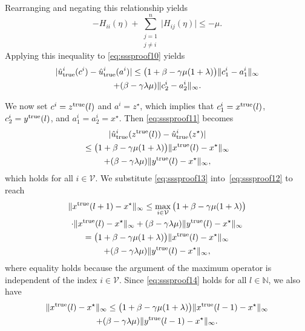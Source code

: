 \documentclass[9pt,shortpaper,twoside,web]{ieeecolor}
\newcommand{\V}{\ensuremath{\mathcal{V}}\xspace}
\newcommand{\tr}{\textnormal{true}}
\begin{document}
    Rearranging and negating this relationship yields
    \begin{equation}
        -H_{ii}(\eta)+\sum_{\substack{j=1\\j\not=i}}^n \vert H_{ij}(\eta)\vert \leq -\mu.
    \end{equation}
    Applying this inequality to \eqref{eq:sssproof10} yields 
    \begin{multline}\label{eq:sssproof11}
        \vert \hat u^i_\tr(c^i)-\hat u^i_\tr(a^i)\vert \leq \big( 1+ \beta -\gamma\mu(1+\lambda)\big)\Vert c^i_1-a^i_1\Vert_\infty
        \\ + (\beta - \gamma\lambda\mu)\Vert c^i_2-a^i_2\Vert_\infty.
    \end{multline}
    
    We now set $c^i=z^\tr(l)$ and $a^i=z^\star$, which implies that $c^i_1=x^\tr(l)$, $c^i_2=y^\tr(l)$, and $a^i_1=a^i_2=x^\star$.
    Then \eqref{eq:sssproof11} becomes
    \begin{multline}\label{eq:sssproof13}
        \vert \hat u^i_\tr(z^\tr(l))-\hat u^i_\tr(z^\star)\vert \\\leq \big( 1+ \beta -\gamma\mu(1+\lambda)\big)\Vert x^\tr(l)-x^\star\Vert_\infty
        \\+ (\beta - \gamma\lambda\mu)\Vert y^\tr(l)-x^\star\Vert_\infty,
    \end{multline}
    which holds for all $i\in\V$.
    We substitute \eqref{eq:sssproof13} into~\eqref{eq:sssproof12} to reach
    \begin{multline}\label{eq:sssproof14}
        \Vert x^\tr(l+1)-x^\star\Vert_\infty \leq \max_{i\in\V} \big( 1+ \beta -\gamma\mu(1+\lambda)\big)
        \\ \cdot\Vert x^\tr(l)-x^\star\Vert_\infty
        + (\beta - \gamma\lambda\mu)\Vert y^\tr(l)-x^\star\Vert_\infty
        \\ = \big( 1+ \beta -\gamma\mu(1+\lambda)\big)
         \Vert x^\tr(l)-x^\star\Vert_\infty
        \\+ (\beta - \gamma\lambda\mu)\Vert y^\tr(l)-x^\star\Vert_\infty,
    \end{multline}
    where equality holds because the argument of the maximum operator is independent of the index $i\in\V$.
    Since \eqref{eq:sssproof14} holds for all $l\in\mathbb{N}$, we also have 
    \begin{multline}\label{eq:sssproof15}
        \Vert x^\tr(l)-x^\star\Vert_\infty \leq \big( 1+ \beta -\gamma\mu(1+\lambda)\big)
         \Vert x^\tr(l-1)-x^\star\Vert_\infty
        \\+ (\beta - \gamma\lambda\mu)\Vert y^\tr(l-1)-x^\star\Vert_\infty.
    \end{multline}
\end{document}
